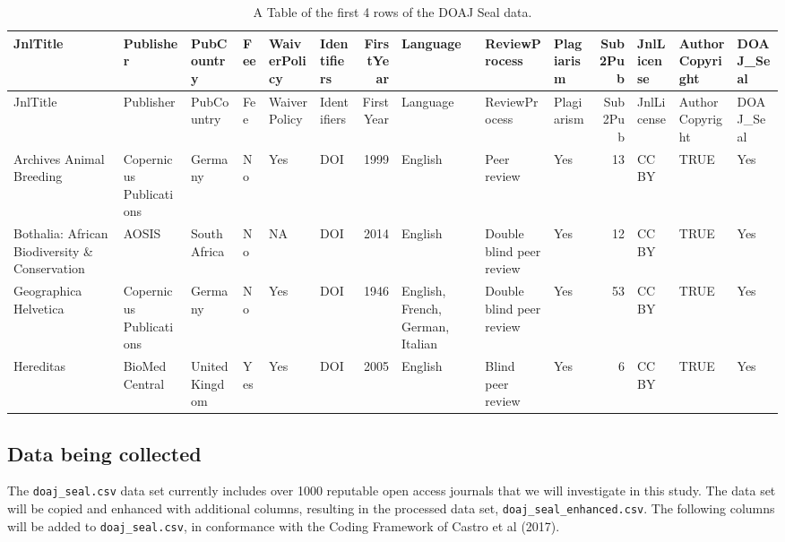 \documentclass[]{article}
\begin{document}
\begin{longtable}[]{@{}llllllrlllrlll@{}}
\caption{A Table of the first 4 rows of the DOAJ Seal
data.}\tabularnewline
\toprule
JnlTitle & Publisher & PubCountry & Fee & WaiverPolicy & Identifiers &
FirstYear & Language & ReviewProcess & Plagiarism & Sub2Pub & JnlLicense
& AuthorCopyright & DOAJ\_Seal\tabularnewline
\midrule
\endfirsthead
\toprule
JnlTitle & Publisher & PubCountry & Fee & WaiverPolicy & Identifiers &
FirstYear & Language & ReviewProcess & Plagiarism & Sub2Pub & JnlLicense
& AuthorCopyright & DOAJ\_Seal\tabularnewline
\midrule
\endhead
Archives Animal Breeding & Copernicus Publications & Germany & No & Yes
& DOI & 1999 & English & Peer review & Yes & 13 & CC BY & TRUE &
Yes\tabularnewline
Bothalia: African Biodiversity \& Conservation & AOSIS & South Africa &
No & NA & DOI & 2014 & English & Double blind peer review & Yes & 12 &
CC BY & TRUE & Yes\tabularnewline
Geographica Helvetica & Copernicus Publications & Germany & No & Yes &
DOI & 1946 & English, French, German, Italian & Double blind peer review
& Yes & 53 & CC BY & TRUE & Yes\tabularnewline
Hereditas & BioMed Central & United Kingdom & Yes & Yes & DOI & 2005 &
English & Blind peer review & Yes & 6 & CC BY & TRUE &
Yes\tabularnewline
\bottomrule
\end{longtable}

\subsection{Data being collected}\label{data-being-collected}

The \texttt{doaj\_seal.csv} data set currently includes over 1000
reputable open access journals that we will investigate in this study.
The data set will be copied and enhanced with additional columns,
resulting in the processed data set, \texttt{doaj\_seal\_enhanced.csv}.
The following columns will be added to \texttt{doaj\_seal.csv}, in
conformance with the Coding Framework of Castro et al (2017).
\end{document}
